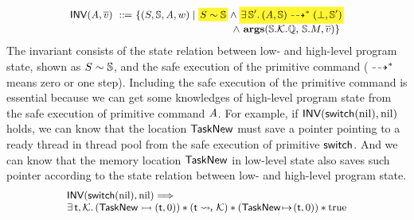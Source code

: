 \[
    \small
    \begin{array}{l}
        \INV{(\primcom, \args{\val})} \ \define \ 
        \{
            (\state, \hpstate, \primcom, \word) \sepline
            \colorbox{yellow!80}{\!$\stateRel{\state}{\hpstate}$\!}
            \land 
            \colorbox{yellow!80}
            {\!\!\!
                $\exists \, \hpstate'. \,
                \primMultiTrans
                    {(\primcom, \hpstate)}
                    {*}{(\primdone, \hpstate')}$ 
            \!\!\!} \\
            \hspace*{15.8em} 
            \land \
            \arguments(\hpstate.\hthrdlocalst.\hRstate, \,  
            \hpstate.\Mem, \args{\val})
        \}
    \end{array}
\]
The invariant consists of the state relation between low- and 
high-level program state,  
shown as ${S} \sim {\mathbb{S}}$, 
and the safe execution of the primitive command
(${} \dashrightarrow^{*} {}$ means zero or one step). 
Including the safe execution of 
the primitive command is essential 
because we can get some knowledges of high-level program 
state from the safe execution of 
primitive command $\textit{A}$. 
For example, if $\textsf{INV}{(\mathsf{switch}(\text{nil}), \text{nil})}$
holds, we can know that the location $\mathsf{TaskNew}$ 
must save a pointer pointing to a ready thread
in thread pool from the safe execution of primitive $\mathsf{switch}$. 
And we can know that the memory location $\mathsf{TaskNew}$ 
in low-level state also saves such pointer 
according to the state relation 
between low- and high-level program state. 
\[
    \small
    \begin{array}{l}
        \textsf{INV}{(\mathsf{switch}(\text{nil}), \text{nil})} 
        \Longrightarrow \\ 
        \exists \, \textsf{t}, \mathcal{K}. \, 
        ({\mathsf{TaskNew}} \rightarrowtail {(\textsf{t}, 0)}) 
        * 
        ({\textsf{t}} \leadsto_{\textsf{r}} {\mathcal{K}})
        *
        ({\mathsf{TaskNew}} \!\mapsto\! {(\textsf{t}, 0)})
        * \text{true}
    \end{array}
\]
